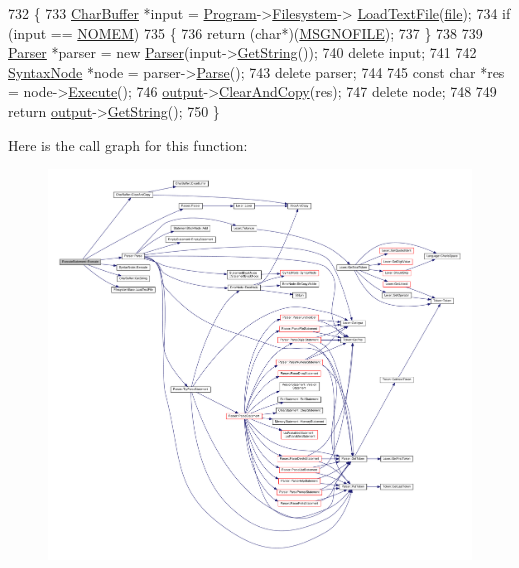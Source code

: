 \begin{DoxyCode}
732 \{
733     \hyperlink{classCharBuffer}{CharBuffer} *input = \hyperlink{classProgram}{Program}->\hyperlink{classProgram_a54fb0dc3ee40a356fe91cea64e569b26}{Filesystem}->
      \hyperlink{classFilesystemBase_adc4a9e1dc189bcd221e3b994bc854d46}{LoadTextFile}(\hyperlink{classExecuteStatement_a9565fccd4169cfcbeb8811085bbdeca5}{file});
734     \textcolor{keywordflow}{if} (input == \hyperlink{platform_8h_a46ff2bfbf0d44b8466a2251d5bd5e6f8}{NOMEM})
735     \{
736         \textcolor{keywordflow}{return} (\textcolor{keywordtype}{char}*)(\hyperlink{text_8h_ae0de195e949c617eb8a792aeb4d4574e}{MSGNOFILE});
737     \}
738 
739     \hyperlink{classParser}{Parser} *parser = \textcolor{keyword}{new} \hyperlink{classParser}{Parser}(input->\hyperlink{classCharBuffer_a7dfd3feaaf80f318ba44efe15b1ec44b}{GetString}());
740     \textcolor{keyword}{delete} input;
741 
742     \hyperlink{classSyntaxNode}{SyntaxNode} *node = parser->\hyperlink{classParser_a1861d1d9cc6165970cf07e07cacd11df}{Parse}();
743     \textcolor{keyword}{delete} parser;
744 
745     \textcolor{keyword}{const} \textcolor{keywordtype}{char} *res = node->\hyperlink{classSyntaxNode_ad8418608fa224536b48a590c87f0a509}{Execute}();
746     \hyperlink{classSyntaxNode_a1180628cbe3fce43930cee0df5a9ce5c}{output}->\hyperlink{classCharBuffer_ac52ed7b91190240eb7db4cf43d1e2abb}{ClearAndCopy}(res);
747     \textcolor{keyword}{delete} node;
748 
749     \textcolor{keywordflow}{return} \hyperlink{classSyntaxNode_a1180628cbe3fce43930cee0df5a9ce5c}{output}->\hyperlink{classCharBuffer_a7dfd3feaaf80f318ba44efe15b1ec44b}{GetString}();
750 \}
\end{DoxyCode}


Here is the call graph for this function\+:\nopagebreak
\begin{figure}[H]
\begin{center}
\leavevmode
\includegraphics[width=350pt]{classExecuteStatement_a8a3bbafeb8739749eab6eaf8a4b9969c_cgraph}
\end{center}
\end{figure}




